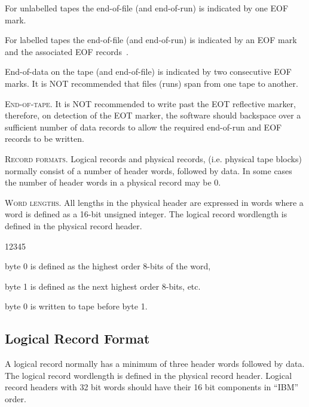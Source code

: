 For unlabelled tapes the end-of-file (and
end-of-run) is indicated by one EOF mark.
 
For labelled tapes the end-of-file (and end-of-run) is indicated by
an EOF mark and the associated EOF records~\cite{bib-LABTAP}.
 
End-of-data on the tape (and end-of-file) is indicated by two
consecutive EOF marks. It is NOT recommended that files (runs) span
from one tape to another.
 
\textsc{End-of-tape}. It is NOT recommended to write past the EOT reflective
marker, therefore, on detection of the EOT marker, the software should
backspace over a sufficient number of data records to allow the
required end-of-run and EOF records to be written.
 
\textsc{Record formats}.  Logical records and physical records, (i.e. physical
tape blocks) normally consist of a number of header words, followed by
data. In some cases the number of header words in a physical record
may be 0.
 
\textsc{Word lengths}.  All lengths in the physical header are expressed in words
where a word is defined as a 16-bit unsigned integer.
The logical record wordlength is defined in the physical record header.
 
\begin{DLtt}{12345}
\item[byte 0] is defined as the highest order 8-bits of the word,
\item[byte 1] is defined as the next highest order 8-bits, etc.
\item[byte 0] is written to tape before byte 1.
\end{DLtt}

\clearpage
\subsection*{Logical Record Format}
 
A logical record normally has a minimum of three header words followed
by data. The logical record wordlength is defined in the physical record
header. Logical record headers with 32 bit words should have their 16
bit components in ``IBM'' order.

